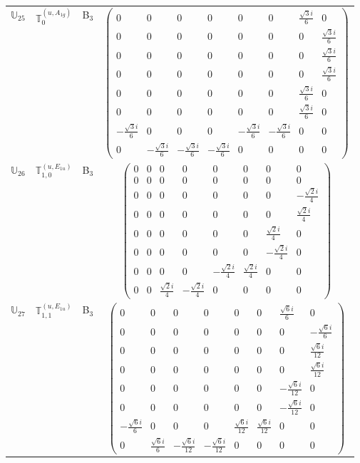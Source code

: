 \documentclass[fleqn,10pt,landscape]{article}
\begin{document}
\begin{itemize}
\begin{center}
\begin{longtable}{c|c|c|c}
$ \mathbb{U}_{25} $ & $\mathbb{T}_{0}^{(u,A_{1g})}$ & B$_{3}$ & $\begin{pmatrix} 0 & 0 & 0 & 0 & 0 & 0 & \frac{\sqrt{3} i}{6} & 0 \\ 0 & 0 & 0 & 0 & 0 & 0 & 0 & \frac{\sqrt{3} i}{6} \\ 0 & 0 & 0 & 0 & 0 & 0 & 0 & \frac{\sqrt{3} i}{6} \\ 0 & 0 & 0 & 0 & 0 & 0 & 0 & \frac{\sqrt{3} i}{6} \\ 0 & 0 & 0 & 0 & 0 & 0 & \frac{\sqrt{3} i}{6} & 0 \\ 0 & 0 & 0 & 0 & 0 & 0 & \frac{\sqrt{3} i}{6} & 0 \\ - \frac{\sqrt{3} i}{6} & 0 & 0 & 0 & - \frac{\sqrt{3} i}{6} & - \frac{\sqrt{3} i}{6} & 0 & 0 \\ 0 & - \frac{\sqrt{3} i}{6} & - \frac{\sqrt{3} i}{6} & - \frac{\sqrt{3} i}{6} & 0 & 0 & 0 & 0 \end{pmatrix}$ \\
$ \mathbb{U}_{26} $ & $\mathbb{T}_{1,0}^{(u,E_{1u})}$ & B$_{3}$ & $\begin{pmatrix} 0 & 0 & 0 & 0 & 0 & 0 & 0 & 0 \\ 0 & 0 & 0 & 0 & 0 & 0 & 0 & 0 \\ 0 & 0 & 0 & 0 & 0 & 0 & 0 & - \frac{\sqrt{2} i}{4} \\ 0 & 0 & 0 & 0 & 0 & 0 & 0 & \frac{\sqrt{2} i}{4} \\ 0 & 0 & 0 & 0 & 0 & 0 & \frac{\sqrt{2} i}{4} & 0 \\ 0 & 0 & 0 & 0 & 0 & 0 & - \frac{\sqrt{2} i}{4} & 0 \\ 0 & 0 & 0 & 0 & - \frac{\sqrt{2} i}{4} & \frac{\sqrt{2} i}{4} & 0 & 0 \\ 0 & 0 & \frac{\sqrt{2} i}{4} & - \frac{\sqrt{2} i}{4} & 0 & 0 & 0 & 0 \end{pmatrix}$ \\
$ \mathbb{U}_{27} $ & $\mathbb{T}_{1,1}^{(u,E_{1u})}$ & B$_{3}$ & $\begin{pmatrix} 0 & 0 & 0 & 0 & 0 & 0 & \frac{\sqrt{6} i}{6} & 0 \\ 0 & 0 & 0 & 0 & 0 & 0 & 0 & - \frac{\sqrt{6} i}{6} \\ 0 & 0 & 0 & 0 & 0 & 0 & 0 & \frac{\sqrt{6} i}{12} \\ 0 & 0 & 0 & 0 & 0 & 0 & 0 & \frac{\sqrt{6} i}{12} \\ 0 & 0 & 0 & 0 & 0 & 0 & - \frac{\sqrt{6} i}{12} & 0 \\ 0 & 0 & 0 & 0 & 0 & 0 & - \frac{\sqrt{6} i}{12} & 0 \\ - \frac{\sqrt{6} i}{6} & 0 & 0 & 0 & \frac{\sqrt{6} i}{12} & \frac{\sqrt{6} i}{12} & 0 & 0 \\ 0 & \frac{\sqrt{6} i}{6} & - \frac{\sqrt{6} i}{12} & - \frac{\sqrt{6} i}{12} & 0 & 0 & 0 & 0 \end{pmatrix}$ \\

\end{longtable}
\end{center}
\end{itemize}
\end{document}
